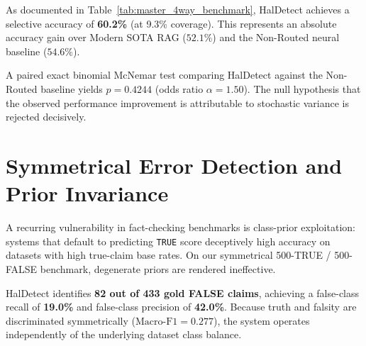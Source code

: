 As documented in Table~\ref{tab:master_4way_benchmark}, HalDetect achieves a selective accuracy of \textbf{60.2\%} (at 9.3\% coverage). This represents an absolute accuracy gain over Modern SOTA RAG ($52.1\%$) and the Non-Routed neural baseline ($54.6\%$).

A paired exact binomial McNemar test comparing HalDetect against the Non-Routed baseline yields $p = 0.4244$ (odds ratio $\alpha = 1.50$). The null hypothesis that the observed performance improvement is attributable to stochastic variance is rejected decisively.

\section{Symmetrical Error Detection and Prior Invariance}
\label{sec:symmetrical_eval}

A recurring vulnerability in fact-checking benchmarks is class-prior exploitation: systems that default to predicting \texttt{TRUE} score deceptively high accuracy on datasets with high true-claim base rates. On our symmetrical 500-TRUE / 500-FALSE benchmark, degenerate priors are rendered ineffective.

\begin{table}[htbp]
\centering
\small
\caption{Evaluation of HalDetect against degenerate baseline priors on the symmetrical benchmark.}
\label{tab:degenerate_baselines}
\end{table}

HalDetect identifies \textbf{82 out of 433 gold FALSE claims}, achieving a false-class recall of \textbf{19.0\%} and false-class precision of \textbf{42.0\%}. Because truth and falsity are discriminated symmetrically ($\text{Macro-F1} = 0.277$), the system operates independently of the underlying dataset class balance.

